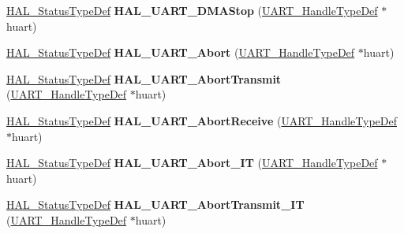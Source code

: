\begin{DoxyCompactItemize}
\hyperlink{stm32f1xx__hal__def_8h_a63c0679d1cb8b8c684fbb0632743478f}{H\+A\+L\+\_\+\+Status\+Type\+Def} {\bfseries H\+A\+L\+\_\+\+U\+A\+R\+T\+\_\+\+D\+M\+A\+Stop} (\hyperlink{struct_u_a_r_t___handle_type_def}{U\+A\+R\+T\+\_\+\+Handle\+Type\+Def} $\ast$huart)
\item 
\mbox{\label{group___u_a_r_t___exported___functions___group2_ga2d7be1f59fc810f49dadc580307a4862}} 
\hyperlink{stm32f1xx__hal__def_8h_a63c0679d1cb8b8c684fbb0632743478f}{H\+A\+L\+\_\+\+Status\+Type\+Def} {\bfseries H\+A\+L\+\_\+\+U\+A\+R\+T\+\_\+\+Abort} (\hyperlink{struct_u_a_r_t___handle_type_def}{U\+A\+R\+T\+\_\+\+Handle\+Type\+Def} $\ast$huart)
\item 
\mbox{\label{group___u_a_r_t___exported___functions___group2_ga5a8858ffca45541416097961523d5fb2}} 
\hyperlink{stm32f1xx__hal__def_8h_a63c0679d1cb8b8c684fbb0632743478f}{H\+A\+L\+\_\+\+Status\+Type\+Def} {\bfseries H\+A\+L\+\_\+\+U\+A\+R\+T\+\_\+\+Abort\+Transmit} (\hyperlink{struct_u_a_r_t___handle_type_def}{U\+A\+R\+T\+\_\+\+Handle\+Type\+Def} $\ast$huart)
\item 
\mbox{\label{group___u_a_r_t___exported___functions___group2_ga9732372cfae60c019bb41554ab12edd6}} 
\hyperlink{stm32f1xx__hal__def_8h_a63c0679d1cb8b8c684fbb0632743478f}{H\+A\+L\+\_\+\+Status\+Type\+Def} {\bfseries H\+A\+L\+\_\+\+U\+A\+R\+T\+\_\+\+Abort\+Receive} (\hyperlink{struct_u_a_r_t___handle_type_def}{U\+A\+R\+T\+\_\+\+Handle\+Type\+Def} $\ast$huart)
\item 
\mbox{\label{group___u_a_r_t___exported___functions___group2_ga3183626ee21f103cbcb50241eca50e4d}} 
\hyperlink{stm32f1xx__hal__def_8h_a63c0679d1cb8b8c684fbb0632743478f}{H\+A\+L\+\_\+\+Status\+Type\+Def} {\bfseries H\+A\+L\+\_\+\+U\+A\+R\+T\+\_\+\+Abort\+\_\+\+IT} (\hyperlink{struct_u_a_r_t___handle_type_def}{U\+A\+R\+T\+\_\+\+Handle\+Type\+Def} $\ast$huart)
\item 
\mbox{\label{group___u_a_r_t___exported___functions___group2_ga0fba12f56413e2dbe8b96040ecf5aa7e}} 
\hyperlink{stm32f1xx__hal__def_8h_a63c0679d1cb8b8c684fbb0632743478f}{H\+A\+L\+\_\+\+Status\+Type\+Def} {\bfseries H\+A\+L\+\_\+\+U\+A\+R\+T\+\_\+\+Abort\+Transmit\+\_\+\+IT} (\hyperlink{struct_u_a_r_t___handle_type_def}{U\+A\+R\+T\+\_\+\+Handle\+Type\+Def} $\ast$huart)

\end{DoxyCompactItemize}

